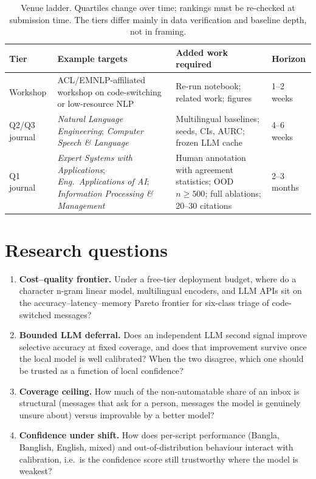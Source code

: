 \documentclass[11pt]{article}
\begin{document}
\begin{table}[htbp]
\centering
\small
\begin{tabular}{@{}p{2.2cm}p{4.5cm}p{4.9cm}p{2.5cm}@{}}
\toprule
Tier & Example targets & Added work required & Horizon \\
\midrule
Workshop & ACL/EMNLP-affiliated workshop on code-switching
          or low-resource NLP & Re-run notebook; related work; figures
          & 1--2 weeks \\
Q2/Q3 journal & \emph{Natural Language Engineering};
          \emph{Computer Speech \& Language} & Multilingual baselines; seeds,
          CIs, AURC; frozen LLM cache & 4--6 weeks \\
Q1 journal & \emph{Expert Systems with Applications};
          \emph{Eng.\ Applications of AI};
          \emph{Information Processing \& Management}
          & Human annotation with agreement statistics; OOD $n \geq 500$;
          full ablations; 20--30 citations & 2--3 months \\
\bottomrule
\end{tabular}
\caption{Venue ladder. Quartiles change over time; rankings must be re-checked
at submission time. The tiers differ mainly in data verification and baseline
depth, not in framing.}
\label{tab:ladder}
\end{table}

\section{Research questions}
\begin{enumerate}[label=RQ\arabic*,leftmargin=*]
      \item \textbf{Cost--quality frontier.} Under a free-tier deployment
      budget, where do a character n-gram linear model, multilingual encoders,
      and LLM APIs sit on the accuracy--latency--memory Pareto frontier for
      six-class triage of code-switched messages?
      \item \textbf{Bounded LLM deferral.} Does an independent LLM second
      signal improve selective accuracy at fixed coverage, and does that
      improvement survive once the local model is well calibrated? When the two
      disagree, which one should be trusted as a function of local confidence?
      \item \textbf{Coverage ceiling.} How much of the non-automatable share of
      an inbox is structural (messages that ask for a person, messages the
      model is genuinely unsure about) versus improvable by a better model?
      \item \textbf{Confidence under shift.} How does per-script performance
      (Bangla, Banglish, English, mixed) and out-of-distribution behaviour
      interact with calibration, i.e.~is the confidence score still trustworthy
      where the model is weakest?
\end{enumerate}
\end{document}
